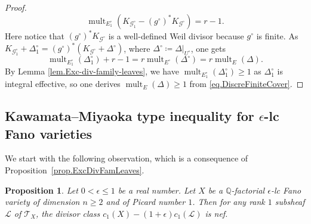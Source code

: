 \documentclass[12pt,twoside]{amsart}
\DeclareMathOperator{\mult}{mult}
\newtheorem{prop}[thm]{Proposition}
\theoremstyle{definition}
\begin{document}
\begin{proof}
		\[
		\mult_{E_1^{\circ}} (K_{\mathcal{G}_1^{\circ}} - (g^{\circ})^* K_{\mathcal{G}^{\circ}}) = r-1.
		\]
		Here notice that $(g^{\circ})^* K_{\mathcal{G}^{\circ}}$ is a well-defined Weil divisor because $g^{\circ}$ is finite.
 As $K_{\mathcal{G}_1^{\circ}}+\Delta_1^{\circ}=(g^{\circ})^*(K_{\mathcal{G}^{\circ}}+\Delta^{\circ})$, where $\Delta^{\circ}\coloneqq \Delta|_{U^{\circ}}$, one gets
		\begin{equation}
			\label{eq.DiscreFiniteCover}
			\mult_{E_1^{\circ}} (\Delta_1^{\circ}) + r - 1 = r\mult_{E^{\circ}}(\Delta^{\circ}) = r\mult_E(\Delta).
		\end{equation}
		By Lemma \ref{lem.Exc-div-family-leaves}, we have $\mult_{E_1^{\circ}}(\Delta_1^{\circ})\geq 1$ as $\Delta_1^{\circ}$ is integral effective, so one derives $\mult_E(\Delta)\geq 1$ from \eqref{eq.DiscreFiniteCover}.
	\end{proof}

\subsection{Kawamata--Miyaoka type inequality for $\epsilon$-lc Fano varieties}

We start with the following observation, which is a consequence of Proposition~\ref{prop.ExcDivFamLeaves}.

\begin{prop}
	\label{prop.SlopeRkOneSubsheaf}
    Let $0< \epsilon\leq 1$ be a real number. Let $X$ be a $\mathbb Q$-factorial $\epsilon$-lc Fano variety of dimension $n\geq 2$ and of Picard number $1$. Then for any rank $1$ subsheaf $\mathcal{L}$ of $\mathcal{T}_X$, the divisor class $c_1(X)-(1+\epsilon)c_1(\mathcal{L})$ is nef.
\end{prop}
\end{document}
